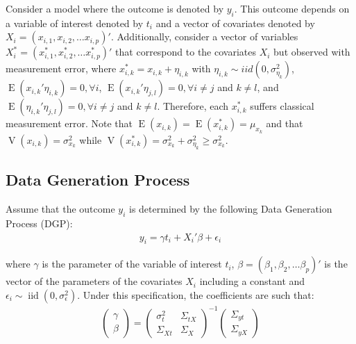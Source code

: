 \documentclass[12pt]{article}
\def\b{\beta}
\def\g{\gamma}
\begin{document}
    Consider a model where the outcome is denoted by $y_i$. This outcome depends on a variable of interest denoted by $t_i$ and a vector of covariates denoted by $X_i=(x_{i,1},x_{i,2},\dots x_{i,p})'$. Additionally, consider a vector of variables $X^*_i=(x^*_{i,1},x^*_{i,2},\dots x^*_{i,p})'$ that correspond to the covariates $X_i$ but observed with measurement error, where $x^*_{i,k}=x_{i,k}+\eta_{i,k}$ with $\eta_{i,k} \sim {iid}(0,\sigma^2_{\eta_k})$, $\operatorname{E}(x_{i,k}'\eta_{i,k})=0, \forall i$, $\operatorname{E}(x_{i,k}'\eta_{j,l})=0, \forall i\neq j$ and $k \neq l$, and $\operatorname{E}(\eta_{i,k}'\eta_{j,l})=0, \forall i\neq j$ and $k \neq l$. Therefore, each $x^*_{i,k}$ suffers classical measurement error. Note that $\operatorname{E}(x_{i,k})=\operatorname{E}(x^*_{i,k})=\mu_{x_k}$ and that $\operatorname{V}(x_{i,k})=\sigma^2_{x_k}$ while $\operatorname{V}(x^*_{i,k})=\sigma^2_{x_k}+\sigma^2_{\eta_k}\geq \sigma^2_{x_k}$.

    \subsection{Data Generation Process}

    Assume that the outcome $y_i$ is determined by the following Data Generation Process (DGP):
    \begin{align}
        y_i = \gamma t_i + X_i'\beta + \epsilon_i
    \end{align}

    where $\g$ is the parameter of the variable of interest $t_i$, $\b=(\b_1,\b_2,\dots \b_p)'$ is the vector of the parameters of the covariates $X_i$ including a constant and $\epsilon_i \sim \operatorname{iid}(0,\sigma^2_\epsilon)$. Under this specification, the coefficients are such that:
    \begin{align}
        \left(\begin{array}{l}
    {\gamma} \\
    {\beta}
    \end{array}\right)=\left(\begin{array}{cc}
    {\sigma}^2_{t} & \Sigma_{tX} \\
    \Sigma_{Xt} & {\Sigma}_{X}
    \end{array}\right)^{-1}\left(\begin{array}{c}
    \Sigma_{yt} \\
    \Sigma_{yX}
    \end{array}\right)
    \end{align}
\end{document}
